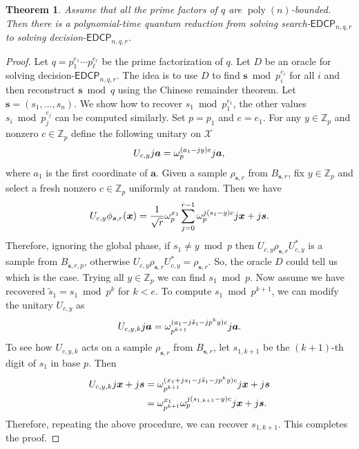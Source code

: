\documentclass[11pt]{article}
\theoremstyle{plain}
\newtheorem{theorem}{Theorem}
\theoremstyle{definition}
\DeclareMathOperator{\poly}{poly}
\let\ket\relax
\DeclarePairedDelimiter{\ket}{\lvert}{\rangle}
\def\Z{\mathbb{Z}}
\def\edcp{\mathsf{EDCP}}
\begin{document}
\begin{theorem}
    Assume that all the prime factors of $q$ are $\poly(n)$-bounded. Then there is a polynomial-time quantum reduction from solving search-$\edcp_{n, q, r}$ to solving decision-$\edcp_{n, q, r}$.
\end{theorem}
\begin{proof}
    Let $q = p_1^{e_1} \cdots p_\ell^{e_\ell}$ be the prime factorization of $q$. Let $D$ be an oracle for solving decision-$\edcp_{n, q, r}$. The idea is to use $D$ to find $\bm{s} \bmod p_i^{e_i}$ for all $i$ and then reconstruct $\bm{s} \bmod q$ using the Chinese remainder theorem. Let $\bm{s} = (s_1, \dots, s_n)$. We show how to recover $s_1 \bmod p_1^{e_1}$, the other values $s_i \bmod p_j^{e_j}$ can be computed similarly. Set $p = p_1$ and $e = e_1$.
    For any $y \in \Z_p$ and nonzero $c \in \Z_p$ define the following unitary on $\mathcal{X}$
    \[ U_{c, y} \ket{j}\ket{\bm{a}} = \omega_p^{(a_1 - jy)c}\ket{j}\ket{\bm{a}}, \]
    where $a_1$ is the first coordinate of $\bm{a}$. Given a sample $\rho_{\bm{s}, r}$ from $B_{\bm{s}, r}$, fix $y \in \Z_p$ and select a fresh nonzero $c \in \Z_p$ uniformly at random. Then we have
    \[ U_{c, y}\ket{\phi_{\bm{s}, r}(\bm{x})} = \frac{1}{\sqrt{r}} \omega_p^{x_1}\sum_{j = 0}^{r - 1} \omega_p^{j(s_1 - y)c} \ket{j}\ket{\bm{x} + j\bm{s}}. \]
    Therefore, ignoring the global phase, if $s_1 \ne y \bmod p$ then $U_{c, y} \rho_{\bm{s}, r} U_{c, y}^*$ is a sample from $B_{\bm{s}, r, p}$, otherwise $U_{c, y} \rho_{\bm{s}, r} U_{c, y}^* = \rho_{\bm{s}, r}$. So, the oracle $D$ could tell us which is the case. Trying all $y \in \Z_p$ we can find $s_1 \bmod p$. Now assume we have recovered $\tilde{s}_1 = s_1 \bmod p^k$ for $k < e$. To compute $s_1 \bmod p^{k + 1}$, we can modify the unitary $U_{c, y}$ as 
    \[ U_{c, y, k} \ket{j}\ket{\bm{a}} = \omega_{p^{k + 1}}^{(a_1 - j\tilde{s}_1 - jp^ky)c}\ket{j}\ket{\bm{a}}. \]
    To see how $U_{c, y, k}$ acts on a sample $\rho_{\bm{s}, r}$ from $B_{\bm{s}, r}$, let $s_{1, k + 1}$ be the $(k + 1)$-th digit of $s_1$ in base $p$. Then
    \begin{align*}
        U_{c, y, k} \ket{j}\ket{\bm{x} + j\bm{s}}
        & = \omega_{p^{k + 1}}^{(x_1 + js_1 - j\tilde{s}_1 - jp^ky)c}\ket{j}\ket{\bm{x} + j\bm{s}} \\
        & = \omega_{p^{k + 1}}^{x_1} \omega_p^{j(s_{1, k + 1} - y)c}\ket{j}\ket{\bm{x} + j\bm{s}}.
    \end{align*}
    Therefore, repeating the above procedure, we can recover $s_{1, k + 1}$. This completes the proof.
\end{proof}
\end{document}
